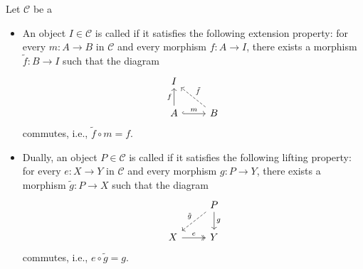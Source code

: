 \begin{definition} \label{definition:injective_and_projective_objects_in_a_category}
Let $\mathcal{C}$ be a 
\begin{itemize}
    \item An object $I \in \mathcal{C}$ is called  if it satisfies the following extension property: for every  $m: A \to B$ in $\mathcal{C}$ and every morphism $f: A \to I$, there exists a morphism $\tilde{f}: B \to I$ such that the diagram
    \[
    \begin{tikzcd}
    I & \\
    A \arrow[u, "f"] \arrow[r, "m", hook] & B \arrow[lu, dashed, "\tilde{f}"']
    \end{tikzcd}
    \]
    commutes, i.e., $\tilde{f} \circ m = f$.

    \item Dually, an object $P \in \mathcal{C}$ is called  if it satisfies the following lifting property: for every  $e: X \to Y$ in $\mathcal{C}$ and every morphism $g: P \to Y$, there exists a morphism $\tilde{g}: P \to X$ such that the diagram
    \[
    \begin{tikzcd}
    & P \arrow[ld, dashed, "\tilde{g}"'] \arrow[d, "g"] \\
    X \arrow[r, "e", two heads] & Y
    \end{tikzcd}
    \]
    commutes, i.e., $e \circ \tilde{g} = g$.
\end{itemize}
\end{definition}

